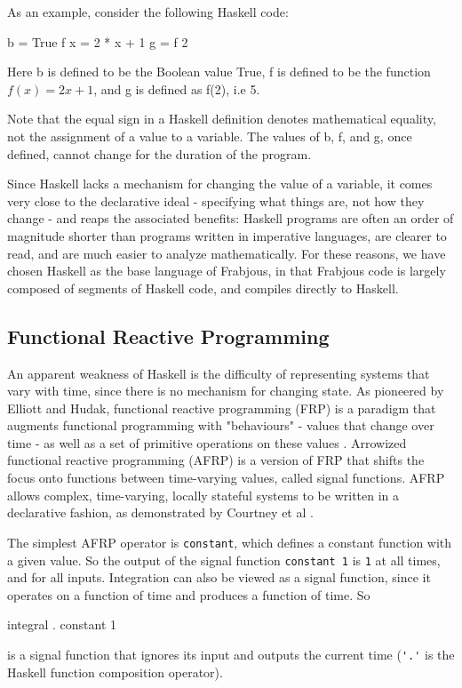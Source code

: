 \documentclass{llncs}
\begin{document}
As an example, consider the following Haskell code:
\begin{code}
  b = True
  f x = 2 * x + 1
  g = f 2
\end{code}
  
  Here b is defined to be the Boolean value True, f is defined to be the function $f(x) = 2x+1$, and g is defined as f(2), i.e 5. 
  
  Note that the equal sign in a Haskell definition denotes mathematical equality, not the assignment of a value to a variable. The values of b, f, and g, once defined, cannot change for the duration of the program.

  Since Haskell lacks a mechanism for changing the value of a variable, it comes very close to the declarative ideal - specifying what things are, not how they change - and reaps the associated benefits: Haskell programs are often an order of magnitude shorter than programs written in imperative languages, are clearer to read, and are much easier to analyze mathematically. For these reasons, we have chosen Haskell as the base language of Frabjous, in that Frabjous code is largely composed of segments of Haskell code, and compiles directly to Haskell.
  
\subsection{Functional Reactive Programming}
 
  An apparent weakness of Haskell is the difficulty of representing systems that vary with time, since there is no mechanism for changing state.  As pioneered by Elliott and Hudak, functional reactive programming (FRP) is a paradigm that augments functional programming with "behaviours" - values that change over time - as well as a set of primitive operations on these values \cite{fran}. Arrowized functional reactive programming (AFRP) is a version of FRP that shifts the focus onto functions between time-varying values, called signal functions\cite{frpcont}. AFRP allows complex, time-varying, locally stateful systems to be written in a declarative fashion, as demonstrated by Courtney et al \cite{yampa}. 
  
  The simplest AFRP operator is \lstinline{constant}, which defines a constant function with a given value. So the output of the signal function \lstinline{constant 1} is \lstinline{1} at all times, and for all inputs. 
  Integration can also be viewed as a signal function, since it operates on a function of time and produces a function of time. So
\begin{code}
integral . constant 1
\end{code}
is a signal function that ignores its input and outputs the current time (\lstinline{'.'} is the Haskell function composition operator). 
\end{document}
